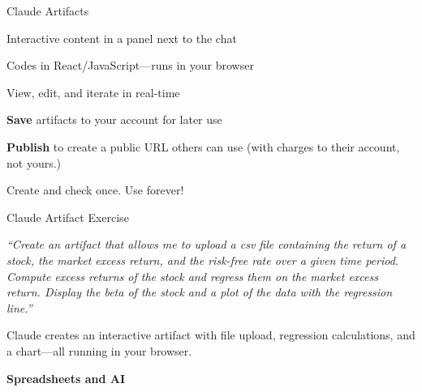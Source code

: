 \documentclass[aspectratio=169]{beamer}
\begin{document}
\begin{frame}{Claude Artifacts}

\begin{baritemize}
  \item Interactive content in a panel next to the chat
  \item Codes in React/JavaScript---runs in your browser
  \item View, edit, and iterate in real-time
  \item \textbf{Save} artifacts to your account for later use
  \item \textbf{Publish} to create a public URL others can use (with charges to \alert{their account, not yours}.)
  \item Create and check once.  Use forever!
\end{baritemize}
\end{frame}

 \begin{frame}{Claude Artifact Exercise}

\textit{``Create an artifact that allows me to upload a csv file containing the return of a stock, the market excess return, and the risk-free rate over a given time period.  Compute excess returns of the stock and regress them on the market excess return.  Display the beta of the stock and a plot of the data with the regression line.''}

\vspace{0.3cm}
Claude creates an interactive artifact with file upload, regression calculations, and a chart---all running in your browser.
\end{frame}



\begin{frame}[plain]
\vfill
\begin{center}
{\fontsize{26}{30}\selectfont\bfseries\color{titlegray} Spreadsheets and AI}
\end{center}
\vfill
\end{frame}
\end{document}

